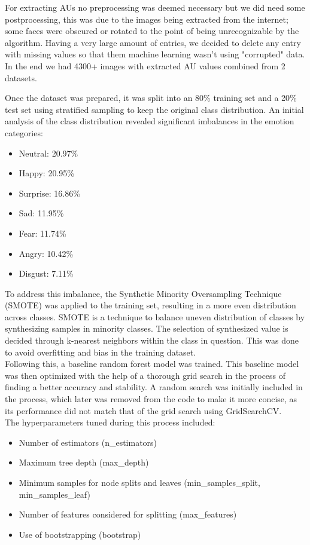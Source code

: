 \documentclass[conference]{IEEEtran}
\begin{document}
For extracting AUs no preprocessing was deemed necessary but we did need some postprocessing, this was
due to the images being extracted from the internet; some faces were obscured or rotated to the point
of being unrecognizable by the algorithm. Having a very large amount of entries, we decided to delete any entry with missing values so that them
machine learning wasn't using "corrupted" data. In the end we had 4300+ images with extracted AU values combined from 2 datasets.


Once the dataset was prepared, it was split into an 80\% training set and a 20\% test set using stratified sampling to keep the original class distribution. An initial analysis of the class distribution revealed significant imbalances in the emotion categories:
\begin{itemize}
    \item Neutral: 20.97\%
	\item Happy: 20.95\%
	\item Surprise: 16.86\%
	\item Sad: 11.95\%
	\item Fear: 11.74\%
	\item Angry: 10.42\%
	\item Disgust: 7.11\%
\end{itemize}	
To address this imbalance, the Synthetic Minority Oversampling Technique (SMOTE) was applied to the training set, resulting in a more even distribution across classes. SMOTE is a technique to balance uneven distribution of classes by synthesizing samples in minority classes. The selection of synthesized value is decided through k-nearest neighbors within the class in question. This was done to avoid overfitting and bias in the training dataset.  
\\Following this, a baseline random forest model was trained.
This baseline model was then optimized with the help of a thorough grid search in the process of finding a better accuracy and stability. A random search was initially included in the process, which later was removed from the code to make it more concise, as its performance did not match that of the grid search using GridSearchCV.
\\
The hyperparameters tuned during this process included:
\begin{itemize}
    \item Number of estimators (n\_estimators)
	\item Maximum tree depth (max\_depth)
	\item Minimum samples for node splits and leaves (min\_samples\_split, min\_samples\_leaf)
	\item Number of features considered for splitting (max\_features)
	\item Use of bootstrapping (bootstrap)
\end{itemize}	
    
\end{document}
